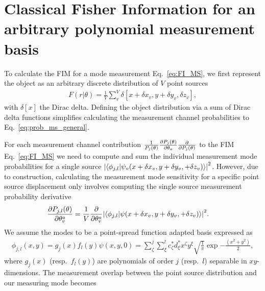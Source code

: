 \documentclass[reprint,amsmath,amssymb,aps,prl,floatfix,groupedaddress,superscriptaddress]{revtex4-2}
\begin{document}
\section{Classical Fisher Information for an arbitrary polynomial measurement basis\label{app:ms_incoherent}}
To calculate the FIM for a mode measurement Eq.~\eqref{eq:FI_MS}, we first represent the object as an arbitrary discrete distribution of $V$ point sources
\begin{align}
    F(r|\theta) = \frac{1}{V} \sum_v^V \delta \left [ x + \delta x_v, y + \delta y_v, \delta z_v \right ],
\end{align}
with $\delta[x]$ the Dirac delta. Defining the object distribution via a sum of Dirac delta functions simplifies calculating the measurement channel probabilities to Eq.~\eqref{eq:prob_ms_general}.

For each measurement channel contribution $\frac{1}{P_j(\theta)} \pdv{P_j(\theta)}{\theta_a}  \pdv{P_j(\theta)}$ to the FIM Eq.~\eqref{eq:FI_MS} we need to compute and sum the individual measurement mode probabilities for a single source $\abs{ \braket{\phi_{j,l}}{\psi_v(x + \delta x_v, y + \delta y_v, + \delta z_v)} }^2$. However, due to construction, calculating the measurement mode sensitivity for a specific point source displacement only involves computing the single source measurement probability derivative
\begin{align}
 \!\!   \pdv{P_{j,l}(\theta)}{\theta_v^a} &= \frac{1}{V} \pdv{}{\theta_v^a} \abs{\braket{\phi_{j,l}}{\psi(x + \delta x_v, y + \delta y_v, + \delta z_v)}}^2.
 \label{eq:pdv_mode_dot_product}
\end{align}
We assume the modes to be a point-spread function adapted basis \cite{rehacek2017optimal} expressed as \begin{align}
    \phi_{j,l}(x,y) = g_j(x)f_l(y)\psi(x,y,0) = \sum_\zeta^j \sum_\xi^l c^*_\zeta d^*_\xi x^\zeta y^\xi \sqrt{\frac{1}{\pi}} \exp{-\frac{(x^2 + y^2)}{2}},
\end{align}
where $g_j(x)$ (resp.~$f_l(y)$) are polynomials of order $j$ (resp.~$l$) separable in $xy$-dimensions. The measurement overlap between the point source distribution and our measuring mode becomes
\end{document}

